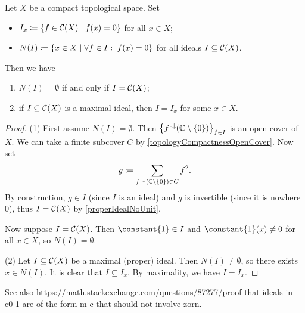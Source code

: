 \begin{lemma} \label{compactCharactersLemma}
Let $X$ be a compact topological space. Set
\begin{itemize}
\item $I_x \defeq \setbuilder{f\in \cont(X)}{f(x) = 0}$ for all $x\in X$;
\item $N(I)\defeq \setbuilder{x\in X}{\forall f\in I: \; f(x) = 0}$ for all ideals $I\subseteq \operatorname{\mathcal{C}}(X)$.
\end{itemize}
Then we have
\begin{enumerate}
\item $N(I) = \emptyset$ \textup{if and only if} $I = \operatorname{\mathcal{C}}(X)$;
\item if $I\subseteq \operatorname{\mathcal{C}}(X)$ is a maximal ideal, then $I = I_x$ for some $x\in X$.
\end{enumerate}
\end{lemma}
\begin{proof}
(1) First assume $N(I) = \emptyset$. Then $\big\{f^{{\text{\hspace{0.15em}-}\downarrow}}(\mathbb{C}\setminus\{0\})\big\}_{f\in I}$ is an open cover of $X$. We can take a finite subcover $C$ by \ref{topologyCompactnessOpenCover}. Now set
\[ g \coloneqq \sum_{f^{{\text{\hspace{0.15em}-}\downarrow}}(\mathbb{C}\setminus\{0\})\in C} f^2. \]
By construction, $g\in I$ (since $I$ is an ideal) and $g$ is invertible (since it is nowhere $0$), thus $I = \operatorname{\mathcal{C}}(X)$ by \ref{properIdealNoUnit}.

Now suppose $I = \operatorname{\mathcal{C}}(X)$. Then $\constant{1}\in I$ and $\constant{1}(x) \neq 0$ for all $x\in X$, so $N(I)=\emptyset$.

(2) Let $I\subseteq \operatorname{\mathcal{C}}(X)$ be a maximal (proper) ideal. Then $N(I) \neq \emptyset$, so there exists $x\in N(I)$. It is clear that $I\subseteq I_x$. By maximality, we have $I = I_x$.
\end{proof}

See also \url{https://math.stackexchange.com/questions/87277/proof-that-ideals-in-c0-1-are-of-the-form-m-c-that-should-not-involve-zorn}.



